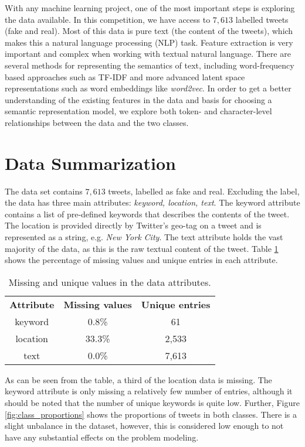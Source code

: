\documentclass[journal, ]{IEEEtran}
\let\MYoriglatexcaption\caption
\renewcommand{\caption}[2][\relax]{\MYoriglatexcaption[#2]{#2}}
\begin{document}
With any machine learning project, one of the most important steps is exploring
the data available. In this competition, we have access to $7,613$ labelled
tweets (fake and real). Most of this data is pure text (the content of the
tweets), which makes this a natural language processing (NLP) task. Feature
extraction is very important and complex when working with textual natural
language. There are several methods for representing the semantics of text,
including word-frequency based approaches such as TF-IDF and more advanced
latent space representations such as word embeddings like
\textit{word2vec}\cite{mikolov2013}. In order to get a better understanding of
the existing features in the data and basis for choosing a semantic
representation model, we explore both token- and character-level relationships
between the data and the two classes.

\section{Data Summarization}
The data set contains $7,613$ tweets, labelled as fake and real. Excluding the
label, the data has three main attributes: \textit{keyword, location, text}.
The keyword attribute contains a list of pre-defined keywords that describes
the contents of the tweet. The location is provided directly by Twitter's
geo-tag on a tweet and is represented as a string, e.g. \textit{New York
City}. The text attribute holds the vast majority of the data, as this is the
raw textual content of the tweet. Table \ref{tab:missing_values} shows the
percentage of missing values and unique entries in each attribute. 

\begin{table}[hbt!]
  \begin{center}
  \begin{tabular}{c|c|c} 
   \hline
    \textbf{Attribute} & \textbf{Missing values}  & \textbf{Unique entries}\\
    keyword & 0.8\% & 61\\
    location & 33.3\% & 2,533\\
    text & 0.0\% & 7,613\\
   \hline
  \end{tabular}
  \end{center}
  \caption{Missing and unique values in the data attributes.}
  \label{tab:missing_values}
\end{table}

As can be seen from the table, a third of the location data is missing. The
keyword attribute is only missing a relatively few number of entries, although
it should be noted that the number of unique keywords is quite low. Further,
Figure \ref{fig:class_proportions} shows the proportions of tweets in both
classes. There is a slight unbalance in the dataset, however, this is
considered low enough to not have any substantial effects on the problem
modeling.
\end{document}
